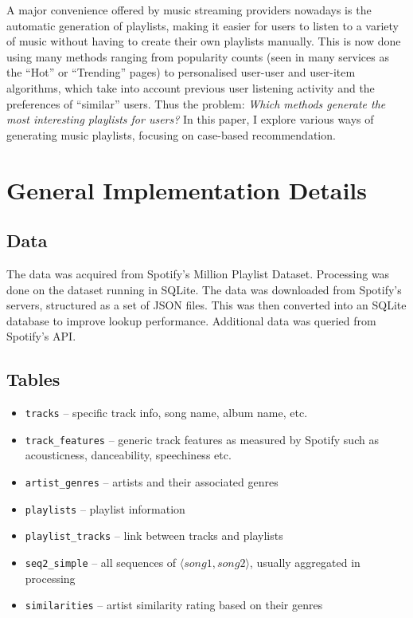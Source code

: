 \documentclass[a4paper, 12pt]{report}
\begin{document}
A major convenience offered by music streaming providers nowadays is the automatic generation of playlists,
making it easier for users to listen to a variety of music without having to create their own playlists manually.
This is now done using many methods ranging from popularity counts (seen in many services as the ``Hot'' or ``Trending'' pages) to personalised user-user and user-item algorithms,
which take into account previous user listening activity and the preferences of ``similar'' users. Thus the problem: \textit{Which
methods generate the most interesting playlists for users?} In this paper, I explore various ways of generating music playlists, focusing on case-based recommendation.


\chapter{General Implementation Details}

\section{Data}
The data was acquired from Spotify's Million Playlist Dataset.
Processing was done on the dataset running in SQLite.
The data was downloaded from Spotify's servers, structured as a set of JSON files.
This was then converted into an SQLite database to improve lookup performance.
Additional data was queried from Spotify's API.

\section{Tables}
\begin{itemize}
    \item \texttt{tracks} -- specific track info, song name, album name, etc.
    \item \texttt{track\_features} -- generic track features as measured by Spotify such as acousticness, danceability, speechiness etc.
    \item \texttt{artist\_genres} -- artists and their associated genres
    \item \texttt{playlists} -- playlist information
    \item \texttt{playlist\_tracks} -- link between tracks and playlists
    \item \texttt{seq2\_simple} -- all sequences of \(\langle song1, song2 \rangle\), usually aggregated in processing
    \item \texttt{similarities} -- artist similarity rating based on their genres
\end{itemize}
\end{document}
